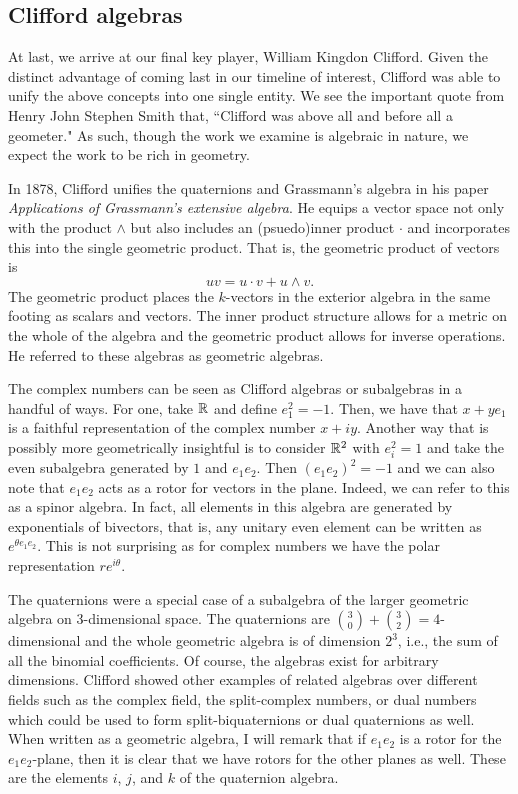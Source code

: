 \documentclass[12pt]{article}
\begin{document}
\subsection{Clifford algebras}

At last, we arrive at our final key player, William Kingdon Clifford. Given the distinct advantage of coming last in our timeline of interest, Clifford was able to unify the above concepts into one single entity. We see the important quote from Henry John Stephen Smith that, ``Clifford was above all and before all a geometer." As such, though the work we examine is algebraic in nature, we expect the work to be rich in geometry.

In 1878, Clifford unifies the quaternions and Grassmann's algebra in his paper \emph{Applications of Grassmann's extensive algebra}. He equips a vector space not only with the product $\wedge$ but also includes an (psuedo)inner product $\cdot$ and incorporates this into the single geometric product. That is, the geometric product of vectors is
\begin{equation}
\label{eq:geometric_product}
uv = u\cdot v + u \wedge v.
\end{equation}
The geometric product places the $k$-vectors in the exterior algebra in the same footing as scalars and vectors. The inner product structure allows for a metric on the whole of the algebra and the geometric product allows for inverse operations. He referred to these algebras as geometric algebras.

The complex numbers can be seen as Clifford algebras or subalgebras in a handful of ways. For one, take $\mathbb{R}$ and define $e_1^2=-1$. Then, we have that $x+ye_1$ is a faithful representation of the complex number $x+iy$. Another way that is possibly more geometrically insightful is to consider $\mathbb{R}^2$ with $e_i^2=1$ and take the even subalgebra generated by $1$ and $e_1e_2$. Then $(e_1e_2)^2=-1$ and we can also note that $e_1e_2$ acts as a rotor for vectors in the plane. Indeed, we can refer to this as a spinor algebra. In fact, all elements in this algebra are generated by exponentials of bivectors, that is, any unitary even element can be written as $e^{\theta e_1 e_2}$. This is not surprising as for complex numbers we have the polar representation $re^{i\theta}$. 

The quaternions were a special case of a subalgebra of the larger geometric algebra on 3-dimensional space. The quaternions are ${{3}\choose{0}}+ {{3}\choose{2}}=4$-dimensional and the whole geometric algebra is of dimension $2^3$, i.e., the sum of all the binomial coefficients. Of course, the algebras exist for arbitrary dimensions. Clifford showed other examples of related algebras over different fields such as the complex field, the split-complex numbers, or dual numbers which could be used to form split-biquaternions or dual quaternions as well. When written as a geometric algebra, I will remark that if $e_1 e_2$ is a rotor for the $e_1 e_2$-plane, then it is clear that we have rotors for the other planes as well. These are the elements $i$, $j$, and $k$ of the quaternion algebra.
\end{document}
